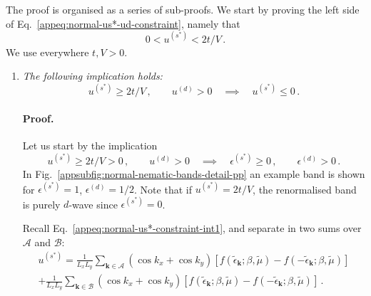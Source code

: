 \begin{tabproof}
	
The proof is organised as a series of sub-proofs. We start by proving the left side of Eq.~\eqref{appeq:normal-us*-ud-constraint}, namely that
\[
	0 < u^{(s^*)} < 2t/V \, .
\]
We use everywhere $t,V>0$.
	
\begin{enumerate}
	\item \textit{The following implication holds:}
	\begin{equation}\label{appeq:normal-us*-absurd-1}
		u^{(s^*)} \ge 2t/V \, , \qquad
		u^{(d)} > 0
		\quad\implies\quad
		u^{(s^*)} \le 0 \, .
	\end{equation}
	
	\paragraph{Proof.}
	
	Let us start by the implication
	\[
		u^{(s^*)} \ge 2t/V > 0 \, ,
		\qquad
		u^{(d)} > 0
		\quad\implies\quad
		\epsilon^{(s^*)} \ge 0 \, ,
		\qquad
		\epsilon^{(d)} > 0 \, .
	\]
	In Fig.~\ref{appsubfig:normal-nematic-bands-detail-pp} an example band is shown for $\epsilon^{(s^*)}=1$, $\epsilon^{(d)}=1/2$. Note that if $u^{(s^*)}=2t/V$, the renormalised band is purely $d$-wave since $\epsilon^{(s^*)}=0$. 
	
	Recall Eq.~\eqref{appeq:normal-us*-constraint-int1}, and separate in two sums over $\mathcal{A}$ and $\mathcal{B}$:
	\begin{multline*}
		u^{(s^*)} = \frac{1}{L_x L_y} \sum_{\mathbf{k}\in\mathcal{A}} (\cos k_x + \cos k_y) \left[
		f(\tilde{\epsilon}_\mathbf{k};\beta,\tilde{\mu}) - f(-\tilde{\epsilon}_\mathbf{k};\beta,\tilde{\mu})
		\right] \\
		+ \frac{1}{L_x L_y} \sum_{\mathbf{k}\in\mathcal{B}} (\cos k_x + \cos k_y) \left[
		f(\tilde{\epsilon}_\mathbf{k};\beta,\tilde{\mu}) - f(-\tilde{\epsilon}_\mathbf{k};\beta,\tilde{\mu})
		\right] \, .
	\end{multline*}
	

\end{enumerate}
\end{tabproof}
